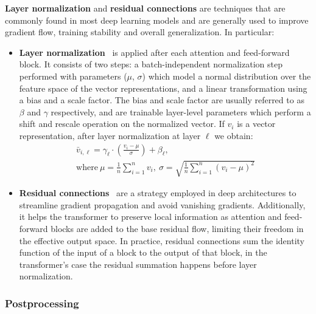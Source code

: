 \textbf{Layer normalization} and \textbf{residual connections} are techniques that are commonly found in most deep learning models and are generally used to improve gradient flow, training stability and overall generalization.
In particular:
\begin{itemize}
    \item \textbf{Layer normalization}~\cite{ba2016} is applied after each attention and feed-forward block.
It consists of two steps: a batch-independent normalization step performed with parameters ($\mu$, $\sigma$) which model a normal distribution over the feature space of the vector representations, and a linear transformation using a bias and a scale factor.
The bias and scale factor are usually referred to as $\beta$ and $\gamma$ respectively, and are trainable layer-level parameters which perform a shift and rescale operation on the normalized vector.
If $v_i$ is a vector representation, after layer normalization at layer $\ell$ we obtain:
\begin{subequations}
    \begin{gather}
        \bar v_{i,\ell} = \gamma_\ell \cdot \left( \frac{v_i - \mu}{\sigma} \right) + \beta_\ell, \label{eq:background_layernorm} \\
        \text{where}\ \mu = \frac{1}{n}\sum_{i=1}^{n}{v_i},\ \sigma = \sqrt{\frac{1}{n}\sum_{i=1}^{n}{{(v_i - \mu)}^2}} \label{eq:background_layernorm_extra}
    \end{gather}
\end{subequations}
    \item \textbf{Residual connections}~\cite{he2016} are a strategy employed in deep architectures to streamline gradient propagation and avoid vanishing gradients.
Additionally, it helps the transformer to preserve local information as attention and feed-forward blocks are added to the base residual flow, limiting their freedom in the effective output space.
In practice, residual connections sum the identity function of the input of a block to the output of that block, in the transformer's case the residual summation happens before layer normalization.
\end{itemize}

\subsubsection*{Postprocessing}


